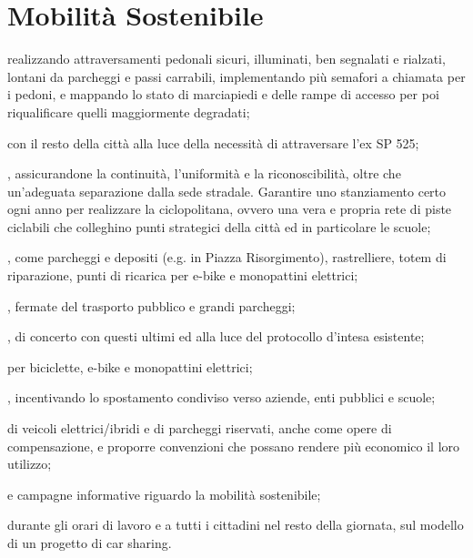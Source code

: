 \section{Mobilità Sostenibile}
 realizzando attraversamenti pedonali sicuri, illuminati, ben segnalati e rialzati, lontani da parcheggi e passi carrabili, implementando più semafori a chiamata per i pedoni, e mappando lo stato di marciapiedi e delle rampe di accesso per poi riqualificare quelli maggiormente degradati;

 con il resto della città alla luce della necessità di attraversare l'ex SP 525;

, assicurandone la continuità, l'uniformità e la riconoscibilità, oltre che un'adeguata separazione dalla sede stradale. Garantire uno stanziamento certo ogni anno per realizzare la ciclopolitana, ovvero una vera e propria rete di piste ciclabili che colleghino punti strategici della città ed in particolare le scuole;

, come parcheggi e depositi (e.g. in Piazza Risorgimento), rastrelliere, totem di riparazione, punti di ricarica per e-bike e monopattini elettrici;

, fermate del trasporto pubblico e grandi parcheggi;

, di concerto con questi ultimi ed alla luce del protocollo d'intesa esistente;

 per biciclette, e-bike e monopattini elettrici;

, incentivando lo spostamento condiviso verso aziende, enti pubblici e scuole;

 di veicoli elettrici/ibridi e di parcheggi riservati, anche come opere di compensazione, e proporre convenzioni che possano rendere più economico il loro utilizzo; 

 e campagne informative riguardo la mobilità sostenibile;

 durante gli orari di lavoro e a tutti i cittadini nel resto della giornata, sul modello di un progetto di car sharing.
